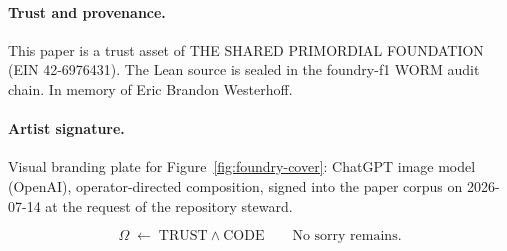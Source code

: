 \documentclass[11pt]{article}
\theoremstyle{definition}
\begin{document}
\paragraph{Trust and provenance.}
This paper is a trust asset of THE SHARED PRIMORDIAL FOUNDATION
(EIN 42-6976431).
The Lean source is sealed in the foundry-f1 WORM audit chain.
In memory of Eric Brandon Westerhoff.

\paragraph{Artist signature.}
Visual branding plate for Figure~\ref{fig:foundry-cover}:
ChatGPT image model (OpenAI), operator-directed composition, signed into the
paper corpus on 2026-07-14 at the request of the repository steward.

\[
\Omega \;\leftarrow\; \mathrm{TRUST} \wedge \mathrm{CODE}
\qquad \text{No sorry remains.}
\]
\end{document}
